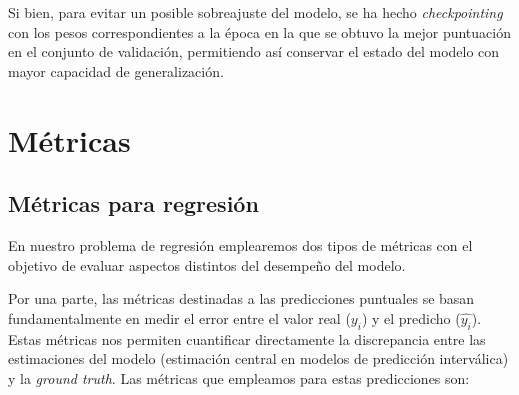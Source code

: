 Si bien, para evitar un posible sobreajuste del modelo, se ha hecho \textit{checkpointing} con los pesos
correspondientes a la época en la que se obtuvo la mejor puntuación en el conjunto de validación, permitiendo 
así conservar el estado del modelo con mayor capacidad de generalización.







\section{Métricas}

\subsection{Métricas para regresión}

En nuestro problema de regresión emplearemos dos tipos de métricas con el objetivo de evaluar aspectos 
distintos del desempeño del modelo.

Por una parte, las métricas destinadas a las predicciones puntuales se basan fundamentalmente en medir el 
error entre el valor real ($y_i$) y el predicho ($\hat{y_i}$). Estas métricas nos permiten cuantificar 
directamente la discrepancia entre las estimaciones del modelo (estimación central en modelos de predicción
interválica) y la \textit{ground truth}. Las métricas que empleamos para estas predicciones son:

